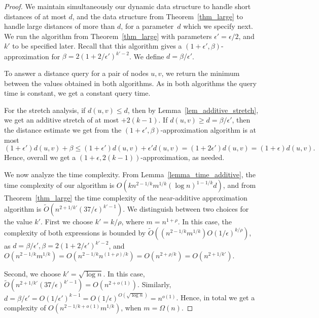 \documentclass[11pt]{article}
\theoremstyle{definition}
\theoremstyle{remark}
\begin{document}
\begin{proof}
We maintain simultaneously our dynamic data structure to handle short distances of at most $d$, and the data structure from Theorem~\ref{thm_large} to handle large distances of more than $d$, for a parameter~$d$ which we specify next. We run the algorithm from Theorem~\ref{thm_large} with parameters $\epsilon' = \epsilon/2$, and $k'$ to be specified later. Recall that this algorithm gives a $(1+\epsilon', \beta)$-approximation for $\beta= 2(1+2/\epsilon')^{k'-2}$. We define $d=\beta/\epsilon'$.

To answer a distance query for a pair of nodes $u,v$, we return the minimum between the values obtained in both algorithms. As in both algorithms the query time is constant, we get a constant query time. 

For the stretch analysis, if $d(u,v) \leq d$, then by Lemma~\ref{lem_additive_stretch}, we get an additive stretch of at most $+2(k-1)$. If $d(u,v) \geq d = \beta/\epsilon'$, then the distance estimate we get from the $(1+\epsilon',\beta)$-approximation algorithm is at most $$(1+\epsilon')d(u,v) + \beta \leq (1+\epsilon')d(u,v) + \epsilon' d(u,v) = (1+2\epsilon')d(u,v)=(1+\epsilon)d(u,v).$$
Hence, overall we get a $(1+\epsilon,2(k-1))$-approximation, as needed.

We now analyze the time complexity. From Lemma~\ref{lemma_time_additive}, the time complexity of our algorithm is $O(kn^{2-1/k}m^{1/k}(\log{n})^{1-1/k} d)$, and from Theorem~\ref{thm_large} the time complexity of the near-additive approximation algorithm is $\tilde{O}(n^{2+1/k'} (37/\epsilon)^{k'-1})$.
We distinguish between two choices for the value $k'$. First we choose $k' = k/\rho$, where $m=n^{1+\rho}$. In this case, the complexity of both expressions is bounded by $\tilde{O}((n^{2-1/k}m^{1/k}) O(1/\epsilon)^{k/\rho})$, as $d=\beta/\epsilon', \beta= 2(1+2/\epsilon')^{k'-2}$, and $O(n^{2-1/k}m^{1/k})=O(n^{2-1/k}n^{(1+\rho)/k})=O(n^{2+\rho/k})=O(n^{2+1/k'})$.

Second, we choose $k' = \sqrt{\log{n}}$. In this case, $\tilde{O}(n^{2+1/k'} (37/\epsilon)^{k'-1})= O(n^{2+o(1)})$. Similarly, $d= \beta/\epsilon' = O(1/\epsilon')^{k-1}= O(1/\epsilon)^{O(\sqrt{\log{n}})}=n^{o(1)}$. Hence, in total we get a complexity of $O(n^{2-1/k+o(1)}m^{1/k})$, when $m=\Omega(n)$.
\end{proof}

\end{document}
